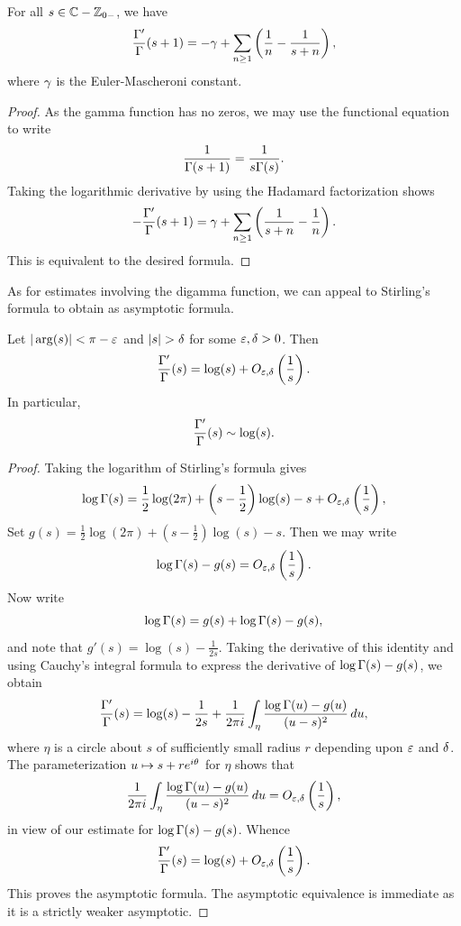     \begin{corollary}\label{cor:logarithmic_derivative_of_gamma}
      For all \(s \in \mathbb{C}-\mathbb{Z}_{0-}\), we have
      \[
        \frac{\Gamma'}{\Gamma}(s+1) = -\gamma+\sum_{n \ge 1}\left(\frac{1}{n}-\frac{1}{s+n}\right),
      \]
      where \(\gamma\) is the Euler-Mascheroni constant.
    \end{corollary}
    \begin{proof}
      As the gamma function has no zeros, we may use the functional equation to write
      \[
        \frac{1}{\Gamma(s+1)} = \frac{1}{s\Gamma(s)}.
      \]
      Taking the logarithmic derivative by using the Hadamard factorization shows
      \[
        -\frac{\Gamma'}{\Gamma}(s+1) = \gamma+\sum_{n \ge 1}\left(\frac{1}{s+n}-\frac{1}{n}\right).
      \]
      This is equivalent to the desired formula.
    \end{proof}

    As for estimates involving the digamma function, we can appeal to Stirling's formula to obtain as asymptotic formula.

    \begin{proposition}\label{equ:approximtion_for_digamma}
      Let \(|\arg(s)| < \pi-\varepsilon\) and \(|s| > \delta\) for some \(\varepsilon,\delta > 0\). Then
      \[
        \frac{\Gamma'}{\Gamma}(s) = \log(s)+O_{\varepsilon,\delta}\left(\frac{1}{s}\right).
      \]
      In particular,
      \[
        \frac{\Gamma'}{\Gamma}(s) \sim \log(s).
      \]
    \end{proposition}
    \begin{proof}
      Taking the logarithm of Stirling's formula gives
      \[
        \log\Gamma(s) = \frac{1}{2}\log(2\pi)+\left(s-\frac{1}{2}\right)\log(s)-s+O_{\varepsilon,\delta}\left(\frac{1}{s}\right),
      \]
      Set \(g(s) = \frac{1}{2}\log(2\pi)+\left(s-\frac{1}{2}\right)\log(s)-s\). Then we may write
      \[
        \log\Gamma(s)-g(s) = O_{\varepsilon,\delta}\left(\frac{1}{s}\right).
      \]
      Now write
      \[
        \log\Gamma(s) = g(s)+\log\Gamma(s)-g(s),
      \]
      and note that \(g'(s) = \log(s)-\frac{1}{2s}\). Taking the derivative of this identity and using Cauchy's integral formula to express the derivative of \(\log\Gamma(s)-g(s)\), we obtain
      \[
        \frac{\Gamma'}{\Gamma}(s) = \log(s)-\frac{1}{2s}+\frac{1}{2\pi i}\int_{\eta}\frac{\log\Gamma(u)-g(u)}{(u-s)^{2}}\,du,
      \]
      where \(\eta\) is a circle about \(s\) of sufficiently small radius \(r\) depending upon \(\varepsilon\) and \(\delta\). The parameterization \(u \mapsto s+re^{i\theta}\) for \(\eta\) shows that
      \[
        \frac{1}{2\pi i}\int_{\eta}\frac{\log\Gamma(u)-g(u)}{(u-s)^{2}}\,du = O_{\varepsilon,\delta}\left(\frac{1}{s}\right),
      \]
      in view of our estimate for \(\log\Gamma(s)-g(s)\). Whence
      \[
        \frac{\Gamma'}{\Gamma}(s) = \log(s)+O_{\varepsilon,\delta}\left(\frac{1}{s}\right).
      \]
      This proves the asymptotic formula. The asymptotic equivalence is immediate as it is a strictly weaker asymptotic.
    \end{proof}

